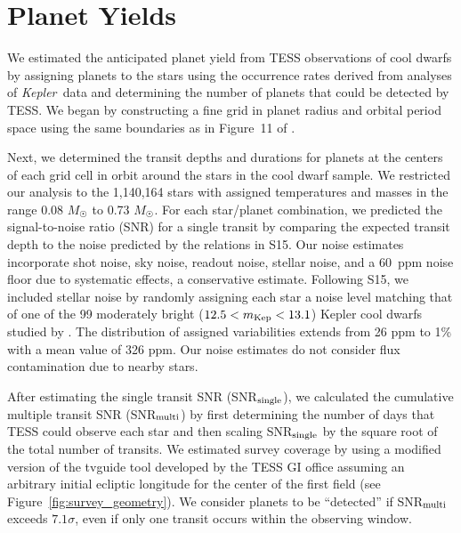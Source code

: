 \documentclass[twocolumn]{aastex62}
\newcommand{\Kepler}{{\it Kepler~}}
\begin{document}
\section{Planet Yields}\label{sec:yield}
We estimated the anticipated planet yield from TESS observations of cool dwarfs by assigning planets to the stars using the occurrence rates derived from analyses of \Kepler data and determining the number of planets that could be detected by TESS. We began by constructing a fine grid in planet radius and orbital period space using the same boundaries as in Figure~11 of \citet{Dressing2015}. 


Next, we determined the transit depths and durations for planets at the centers of each grid cell in orbit around the stars in the cool dwarf sample.  We restricted our analysis to the 1,140,164 stars with assigned temperatures and masses in the range 0.08 $M_\Sun$ to 0.73 $M_\Sun$.  For each star/planet combination, we predicted the signal-to-noise ratio (SNR) for a single transit by comparing the expected transit depth to the noise predicted by the relations in S15. Our noise estimates incorporate shot noise, sky noise, readout noise, stellar noise, and a 60~ppm noise floor due to systematic effects, a conservative estimate.  Following S15, we included stellar noise by randomly assigning each star a noise level matching that of one of the 99 moderately bright ($12.5 < m_{\rm Kep} < 13.1$) Kepler cool dwarfs studied by \citet{Basri2013}. The distribution of assigned variabilities extends from 26 ppm to 1\% with a mean value of 326 ppm. Our noise estimates do not consider flux contamination due to nearby stars.

After estimating the single transit SNR (SNR$_{\rm single}$), we calculated the cumulative multiple transit SNR (SNR$_{\rm multi}$) by first determining the number of days that TESS could observe each star and then scaling SNR$_{\rm single}$ by the square root of the total number of transits. We estimated survey coverage by using a modified version of the tvguide tool developed by the TESS GI office \citep[][]{Mukai2017} assuming an arbitrary initial ecliptic longitude for the center of the first field (see Figure~\ref{fig:survey_geometry}).  We consider planets to be ``detected'' if  SNR$_{\rm multi}$ exceeds $7.1\sigma$, even if only one transit occurs within the observing window.
\end{document}
